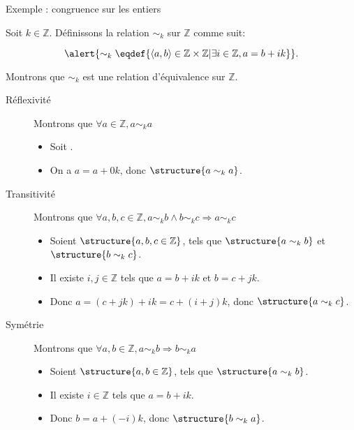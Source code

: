 
\begingroup

\begin{frame}{Exemple : congruence sur les entiers}

  Soit $k\in \mathbb{Z}$. Définissons la relation $\sim_k$ sur $\mathbb{Z}$ comme suit:

  $$\alert{\sim_k \eqdef \{\langle a, b\rangle \in \mathbb{Z}\times \mathbb{Z} | \exists i\in \mathbb{Z}, a = b + i k \}}.$$
  
  Montrons que $\sim_k$ est une relation d'équivalence sur $\mathbb{Z}$.
  \begin{description}
  \item[Réflexivité]  Montrons que \alert{$\forall a \in \mathbb{Z}, a \sim_k a$}
    \begin{itemize}
    \item Soit .
    \item On a $a=a + 0k$, donc $\structure{a\sim_k a}$.
    \end{itemize}
  \item[Transitivité] Montrons que \alert{$\forall a, b, c \in \mathbb{Z}, a \sim_k b \land b \sim_k c \Rightarrow a \sim_k c$}
    \begin{itemize}
    \item Soient $\structure{a, b, c \in \mathbb{Z}}$, tels que $\structure{a \sim_k b}$ et $\structure{b \sim_k c}$. 
    \item Il existe $i, j \in \mathbb{Z}$ tels que $a = b + i k$ et $b = c + j k$.
    \item Donc $a = (c + j k) + i k = c + (i+j) k$, donc $\structure{a \sim_k c}$.
    \end{itemize}
  \item[Symétrie] Montrons que \alert{$\forall a, b \in \mathbb{Z}, a \sim_k b \Rightarrow b \sim_k a$}
    \begin{itemize}
    \item Soient $\structure{a, b \in \mathbb{Z}}$, tels que $\structure{a \sim_k b}$. 
    \item Il existe $i \in \mathbb{Z}$ tels que $a = b + i k$.
    \item Donc $b = a + (-i) k$, donc $\structure{b \sim_k a}$.
    \end{itemize}
  \end{description}
\end{frame}

\endgroup
